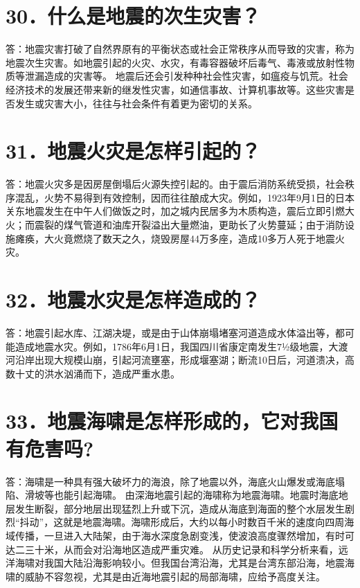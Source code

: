 \documentclass[a4paper,12pt,english]{sphinxmanual}
\begin{document}
\section{30．什么是地震的次生灾害？}
\label{\detokenize{index:id32}}
答：地震灾害打破了自然界原有的平衡状态或社会正常秩序从而导致的灾害，称为地震次生灾害。如地震引起的火灾、水灾，有毒容器破坏后毒气、毒液或放射性物质等泄漏造成的灾害等。
地震后还会引发种种社会性灾害，如瘟疫与饥荒。社会经济技术的发展还带来新的继发性灾害，如通信事故、计算机事故等。这些灾害是否发生或灾害大小，往往与社会条件有着更为密切的关系。


\section{31．地震火灾是怎样引起的？}
\label{\detokenize{index:id33}}
答：地震火灾多是因房屋倒塌后火源失控引起的。由于震后消防系统受损，社会秩序混乱，火势不易得到有效控制，因而往往酿成大灾。例如，1923年9月1日的日本关东地震发生在中午人们做饭之时，加之城内民居多为木质构造，震后立即引燃大火；而震裂的煤气管道和油库开裂溢出大量燃油，更助长了火势蔓延；由于消防设施瘫痪，大火竟燃烧了数天之久，烧毁房屋44万多座，造成10多万人死于地震火灾。


\section{32．地震水灾是怎样造成的？}
\label{\detokenize{index:id34}}
答：地震引起水库、江湖决堤，或是由于山体崩塌堵塞河道造成水体溢出等，都可能造成地震水灾。例如，1786年6月1日，我国四川省康定南发生7½级地震，大渡河沿岸出现大规模山崩，引起河流壅塞，形成堰塞湖；断流10日后，河道溃决，高数十丈的洪水汹涌而下，造成严重水患。


\section{33．地震海啸是怎样形成的，它对我国有危害吗?}
\label{\detokenize{index:id35}}
答：海啸是一种具有强大破坏力的海浪，除了地震以外，海底火山爆发或海底塌陷、滑坡等也能引起海啸。
由深海地震引起的海啸称为地震海啸。地震时海底地层发生断裂，部分地层出现猛烈上升或下沉，造成从海底到海面的整个水层发生剧烈“抖动”，这就是地震海啸。海啸形成后，大约以每小时数百千米的速度向四周海域传播，一旦进入大陆架，由于海水深度急剧变浅，使波浪高度骤然增加，有时可达二三十米，从而会对沿海地区造成严重灾难。
从历史记录和科学分析来看，远洋海啸对我国大陆沿海影响较小。但我国台湾沿海，尤其是台湾东部沿海，地震海啸的威胁不容忽视，尤其是由近海地震引起的局部海啸，应给予高度关注。
\end{document}

